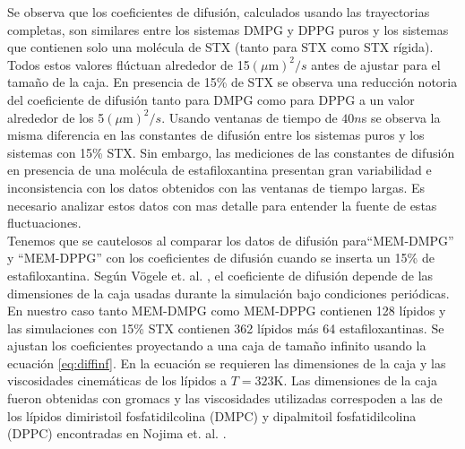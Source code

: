 Se observa que los coeficientes de difusi\'{o}n, calculados usando las trayectorias completas, son similares entre los sistemas DMPG y DPPG puros y los sistemas que contienen solo una mol\'{e}cula de STX (tanto para STX como STX r\'{i}gida). Todos estos valores fl\'{u}ctuan alrededor de 15$(\mu \mathrm{m})^2/s$ antes de ajustar para el tama\~{n}o de la caja. En presencia de 15\% de STX se observa una reducci\'{o}n notoria del coeficiente de difusi\'{o}n tanto para DMPG como para DPPG a un valor alrededor de los 5$(\mu \mathrm{m})^2/s$. Usando ventanas de tiempo de $40n$s se observa la misma diferencia en las constantes de difusi\'{o}n entre los sistemas puros y los sistemas con 15\% STX. Sin embargo, las mediciones de las constantes de difusi\'{o}n en presencia de una mol\'{e}cula de estafiloxantina presentan gran variabilidad e inconsistencia con los datos obtenidos con las ventanas de tiempo largas. Es necesario analizar estos datos con mas detalle para entender la fuente de estas fluctuaciones.\\

Tenemos que se cautelosos al comparar los datos de difusi\'{o}n para``MEM-DMPG'' y ``MEM-DPPG'' con los coeficientes de difusi\'{o}n cuando se inserta un 15\% de estafiloxantina. Seg\'{u}n V\"{o}gele et. al. \cite{Vogele2016DivergentMembranes}, el coeficiente de difusi\'{o}n depende de las dimensiones de la caja usadas durante la simulaci\'{o}n bajo condiciones peri\'{o}dicas. En nuestro caso tanto MEM-DMPG como MEM-DPPG contienen 128 l\'{i}pidos y las simulaciones con 15\% STX  contienen 362 l\'{i}pidos m\'{a}s 64 estafiloxantinas. Se ajustan los coeficientes proyectando a una caja de tama\~{n}o infinito usando la ecuaci\'{o}n \eqref{eq:diffinf}. En la ecuaci\'{o}n se requieren las dimensiones de la caja y las viscosidades cinem\'{a}ticas de los l\'{i}pidos a $T=323$K. Las dimensiones de la caja fueron obtenidas con gromacs y las viscosidades utilizadas correspoden a las de los l\'{i}pidos dimiristoil fosfatidilcolina (DMPC) y dipalmitoil fosfatidilcolina (DPPC) encontradas en Nojima et. al. \cite{Nojima2014ViscositySpectroscopy}.\\


